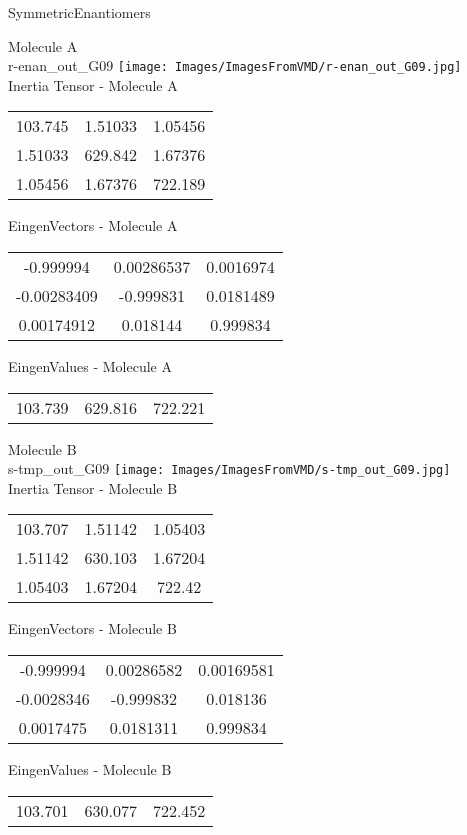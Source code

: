 \vtab[-2cm]
\begin{center}
{\large SymmetricEnantiomers}
\end{center}
\begin{multicols}{2}
\begin{center}
Molecule A \\ 
r-enan\_out\_G09
\texttt{[image: Images/ImagesFromVMD/r-enan\_out\_G09.jpg]}
\\
Inertia Tensor - Molecule A \\
\vtab
\begin{tabular}{|c c c|}
103.745	 & 	1.51033	 & 	1.05456	 \\
1.51033	 & 	629.842	 & 	1.67376	 \\
1.05456	 & 	1.67376	 & 	722.189
\end{tabular}

\vtab
 EingenVectors - Molecule A     \\
\vtab
\begin{tabular}{|c c c|}
-0.999994	 & 	0.00286537	 & 	0.0016974	 \\
-0.00283409	 & 	-0.999831	 & 	0.0181489	 \\
0.00174912	 & 	0.018144	 & 	0.999834
\end{tabular}

\vtab
 EingenValues - Molecule A     \\
\vtab
\begin{tabular}{|c c c|}
103.739	 & 	629.816	 & 	722.221
\end{tabular}
\columnbreak

Molecule B \\ 
s-tmp\_out\_G09
\texttt{[image: Images/ImagesFromVMD/s-tmp\_out\_G09.jpg]}
\\
Inertia Tensor - Molecule B \\
\vtab
\begin{tabular}{|c c c|}
103.707	 & 	1.51142	 & 	1.05403	 \\
1.51142	 & 	630.103	 & 	1.67204	 \\
1.05403	 & 	1.67204	 & 	722.42
\end{tabular}

\vtab
 EingenVectors - Molecule B     \\
\vtab
\begin{tabular}{|c c c|}
-0.999994	 & 	0.00286582	 & 	0.00169581	 \\
-0.0028346	 & 	-0.999832	 & 	0.018136	 \\
0.0017475	 & 	0.0181311	 & 	0.999834
\end{tabular}

\vtab
 EingenValues - Molecule B     \\
\vtab
\begin{tabular}{|c c c|}
103.701	 & 	630.077	 & 	722.452
\end{tabular}

\end{center}
\end{multicols}
